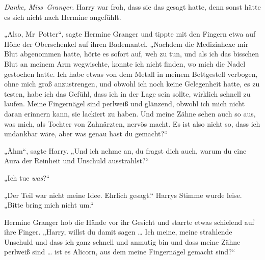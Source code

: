 \emph{Danke, Miss~Granger.} Harry war froh, dass sie das gesagt hatte, denn sonst hätte es sich nicht nach Hermine angefühlt.

„Also, Mr~Potter“, sagte Hermine Granger und tippte mit den Fingern etwa auf Höhe der Oberschenkel auf ihren Bademantel.
„Nachdem die Medizinhexe mir Blut abgenommen hatte, hörte es sofort auf, weh zu tun, und als ich das bisschen Blut an meinem Arm wegwischte, konnte ich nicht finden, wo mich die Nadel gestochen hatte. Ich habe etwas von dem Metall in meinem Bettgestell verbogen, ohne mich groß anzustrengen, und obwohl ich noch keine Gelegenheit hatte, es zu testen, habe ich das Gefühl, dass ich in der Lage sein sollte, wirklich schnell zu laufen. Meine Fingernägel sind perlweiß und glänzend, obwohl ich mich nicht daran erinnern kann, sie lackiert zu haben. Und meine Zähne sehen auch so aus, was mich, als Tochter von Zahnärzten, nervös macht. Es ist also nicht so, dass ich undankbar wäre, aber was genau hast du gemacht?“

„Ähm“, sagte Harry.
„Und ich nehme an, du fragst dich auch, warum du eine Aura der Reinheit und Unschuld ausstrahlst?“

„Ich tue \emph{was}?“

„Der Teil war nicht meine Idee. Ehrlich gesagt.“ Harrys Stimme wurde leise.
„Bitte bring mich nicht um.“

Hermine Granger hob die Hände vor ihr Gesicht und starrte etwas schielend auf ihre Finger.
„Harry, willst du damit sagen … Ich meine, meine strahlende Unschuld und dass ich ganz schnell und anmutig bin und dass meine Zähne perlweiß sind … ist es Alicorn, aus dem meine Fingernägel gemacht sind?“

